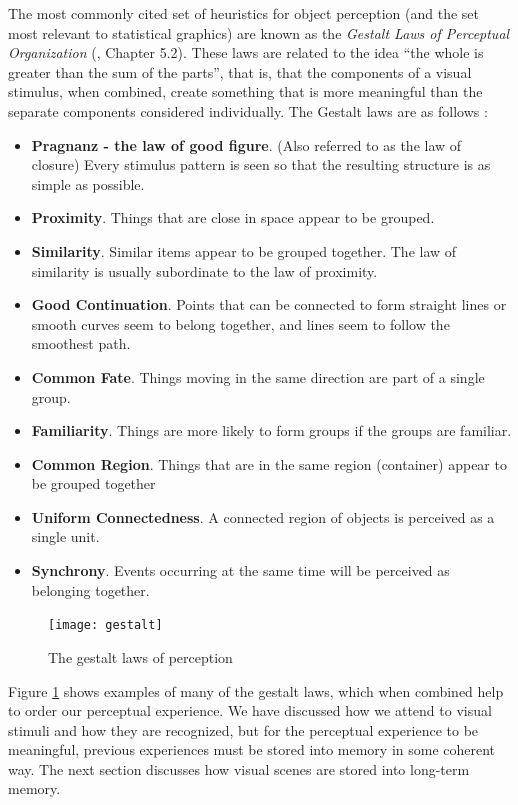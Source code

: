 \documentclass[11pt]{isuthesis}\usepackage[]{graphicx}\usepackage[]{color}
\begin{document}
The most commonly cited set of heuristics for object perception (and the set most relevant to statistical graphics) are known as the \emph{Gestalt Laws of Perceptual Organization} (\citealt{goldstein}, Chapter 5.2). These laws are related to the idea ``the whole is greater than the sum of the parts'', that is, that the components of a visual stimulus, when combined, create something that is more meaningful than the separate components considered individually. The Gestalt laws are as follows \citep{goldstein}: 

\begin{itemize}
\item \textbf{Pragnanz - the law of good figure}. (Also referred to as the law of closure) Every stimulus pattern is seen so that the resulting structure is as simple as possible. 
\item \textbf{Proximity}. Things that are close in space appear to be grouped. 
\item \textbf{Similarity}. Similar items appear to be grouped together. The law of similarity is usually subordinate to the law of proximity. 
\item \textbf{Good Continuation}. Points that can be connected to form straight lines or smooth curves seem to belong together, and lines seem to follow the smoothest path. 
\item \textbf{Common Fate}. Things moving in the same direction are part of a single group.
\item \textbf{Familiarity}. Things are more likely to form groups if the groups are familiar. 
\item \textbf{Common Region}. Things that are in the same region (container) appear to be grouped together
\item \textbf{Uniform Connectedness}. A connected region of objects is perceived as a single unit.
\item \textbf{Synchrony}. Events occurring at the same time will be perceived as belonging together.
\end{itemize}

\begin{figure}[htbp]\centering
\texttt{[image: gestalt]}
\caption[The gestalt laws of perception]{The gestalt laws of perception \protect\footnotemark}\label{fig:gestaltlaws}
\end{figure}
\protect{}
Figure \ref{fig:gestaltlaws} shows examples of many of the gestalt laws, which when combined help to order our perceptual experience. We have discussed how we attend to visual stimuli and how they are recognized, but for the perceptual experience to be meaningful, previous experiences must be stored into memory in some coherent way. The next section discusses how visual scenes are stored into long-term memory. 
\end{document}
